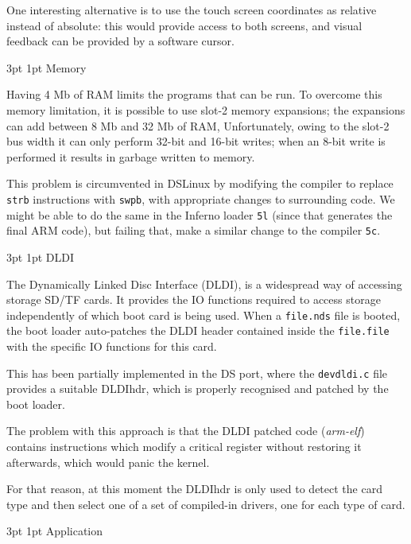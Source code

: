 \documentclass[11pt]{p9article}
\makeatletter
\renewcommand\subsection{\@startsection {subsection}{1}{\z@} {3pt}
{1pt} {\normalfont\normalsize\bfseries}}
\makeatother
\begin{document}
One interesting alternative is to use the
touch screen coordinates as relative instead of absolute:
this would provide access to both screens,
and visual feedback can be provided by a software cursor.

\subsection{Memory}

Having 4 Mb of RAM limits the programs that can be run.
To overcome this memory limitation,
it is possible to use slot-2 memory expansions;
the expansions can add between 8 Mb and 32 Mb of RAM,
Unfortunately, owing to the slot-2 bus width
it can only perform 32-bit and 16-bit writes; when an 8-bit write
is performed it results in garbage written to memory.

This problem is circumvented in DSLinux \cite{DSLinux}
by modifying the compiler to replace \verb+strb+ instructions
with \verb+swpb+, with appropriate changes to surrounding code.
We might be able to do the same in the Inferno loader \verb+5l+ (since that generates the final ARM code),
but failing that, make a similar change to the compiler \verb+5c+.

\subsection{DLDI}

The Dynamically Linked Disc Interface (DLDI)\cite{DLDI}, is a widespread way of accessing storage SD/TF cards.
It provides the IO functions required to access storage
independently of which boot card is being used.
When a \verb+file.nds+ file is booted,
the boot loader auto-patches the DLDI header contained
inside the \verb+file.file+ with the specific IO functions for this card.

This has been partially implemented in the DS port,
where the \verb+devdldi.c+ file provides a suitable DLDIhdr,
which is properly recognised and patched by the boot loader.

The problem with this approach is that the DLDI patched code
(\emph{arm-elf}) contains instructions which modify a critical register
without restoring it afterwards, which would panic the kernel.

For that reason, at this moment the DLDIhdr is only
used to detect the card type and then select one of a set of compiled-in drivers, one
for each type of card.

\subsection{Application}
\end{document}
